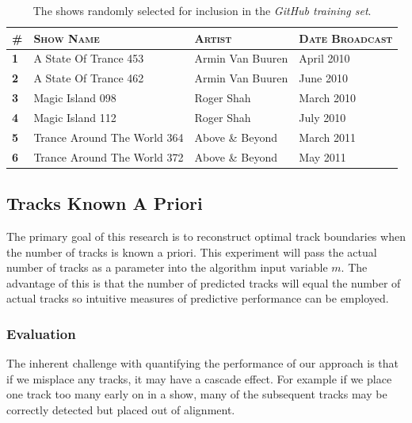 \documentclass[twocolumn]{article}
\begin{document}
\begin{table}[t]
	
	\centering
	\caption{The shows randomly selected for inclusion in the \textit{GitHub training set}.}
	\label{table:githubset}
	
	\begin{tabular}{llll}
		\toprule
		\#         & \textsc{Show Name}          & \textsc{Artist}  & \textsc{Date Broadcast} \\
		\toprule
		\textbf{1} & A State Of Trance 453       & Armin Van Buuren & April 2010              \\
		\textbf{2} & A State Of Trance 462       & Armin Van Buuren & June 2010               \\
		\textbf{3} & Magic Island 098            & Roger Shah       & March 2010              \\
		\textbf{4} & Magic Island 112            & Roger Shah       & July 2010               \\
		\textbf{5} & Trance Around The World 364 & Above \& Beyond  & March 2011              \\
		\textbf{6} & Trance Around The World 372 & Above \& Beyond  & May 2011 
		\\           
		\bottomrule   
	\end{tabular}
	
\end{table}

\subsection{Tracks Known A Priori}\label{sec:apriori}

The primary goal of this research is to reconstruct optimal track boundaries when the number of tracks is known a priori. This experiment will pass the actual number of tracks as a parameter into the algorithm input variable $m$. The advantage of this is that the number of predicted tracks will equal the number of actual tracks so intuitive measures of predictive performance can be employed. 

\subsubsection{Evaluation}\label{eval_crit}

The inherent challenge with quantifying the performance of our approach is that if we misplace any tracks, it may have a cascade effect. For example if we place one track too many early on in a show, many of the subsequent tracks may be correctly detected but placed out of alignment. 
\end{document}

